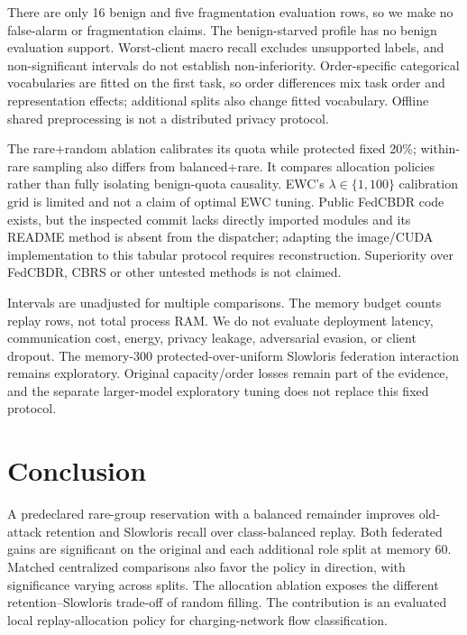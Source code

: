 \documentclass[journal,10pt]{IEEEtran}
\newcommand{\BR}{balanced+rare}
\begin{document}
There are only 16 benign and five fragmentation evaluation rows, so we make no false-alarm or fragmentation claims. The benign-starved profile has no benign evaluation support. Worst-client macro recall excludes unsupported labels, and non-significant intervals do not establish non-inferiority. Order-specific categorical vocabularies are fitted on the first task, so order differences mix task order and representation effects; additional splits also change fitted vocabulary. Offline shared preprocessing is not a distributed privacy protocol.

The rare+random ablation calibrates its quota while protected fixed 20\%; within-rare sampling also differs from \BR. It compares allocation policies rather than fully isolating benign-quota causality. EWC's $\lambda\in\{1,100\}$ calibration grid is limited and not a claim of optimal EWC tuning. Public FedCBDR code exists, but the inspected commit lacks directly imported modules and its README method is absent from the dispatcher; adapting the image/CUDA implementation to this tabular protocol requires reconstruction. Superiority over FedCBDR, CBRS or other untested methods is not claimed.

Intervals are unadjusted for multiple comparisons. The memory budget counts replay rows, not total process RAM. We do not evaluate deployment latency, communication cost, energy, privacy leakage, adversarial evasion, or client dropout. The memory-300 protected-over-uniform Slowloris federation interaction remains exploratory. Original capacity/order losses remain part of the evidence, and the separate larger-model exploratory tuning does not replace this fixed protocol.

\section{Conclusion}
A predeclared rare-group reservation with a balanced remainder improves old-attack retention and Slowloris recall over class-balanced replay. Both federated gains are significant on the original and each additional role split at memory 60. Matched centralized comparisons also favor the policy in direction, with significance varying across splits. The allocation ablation exposes the different retention--Slowloris trade-off of random filling. The contribution is an evaluated local replay-allocation policy for charging-network flow classification.
\end{document}
